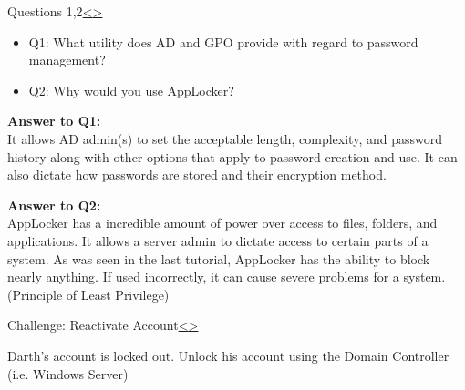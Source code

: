 \documentclass[12pt]{extarticle}
\newenvironment{instructionblock}{\Large\bgroup}{\egroup}
\newcommand{\bi}{\begin{itemize}}
\newcommand{\ei}{\end{itemize}}
\begin{document}
\pagebreak


\pagebreak
\begin{slide}{Questions 1,2}{\hyperref[slide 3]{\textless}\hyperref[slide 5]{\textgreater}}
\begin{instructionblock}
\bi 
\item[Q1:] What utility does AD and GPO provide with regard to password management?
\item[Q2:] Why would you use AppLocker?
\ei

\end{instructionblock}
\end{slide}
\vfill

\vspace{2mm}
\noindent
\textbf{Answer to Q1:}\\
It allows AD admin(s) to set the acceptable length, complexity, and password history along with other options that apply to password creation and use. It can also dictate how passwords are stored and their encryption method.

\vspace{6mm}
\noindent
\textbf{Answer to Q2:}\\
AppLocker has a incredible amount of power over access to files, folders, and applications. It allows a server admin to dictate access to certain parts of a system. As was seen in the last tutorial, AppLocker has the ability to block nearly anything. If used incorrectly, it can cause severe problems for a system. (Principle of Least Privilege)


\pagebreak
\begin{slide}{Challenge: Reactivate Account}{\hyperref[slide 4]{\textless}\hyperref[slide 6]{\textgreater}}
\begin{instructionblock}

Darth's account is locked out. Unlock his account using the Domain Controller (i.e. Windows Server)

\end{instructionblock}
\end{slide} 
\end{document}
